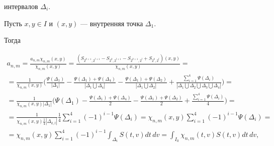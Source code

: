 интервалов $\Delta _{i}$.





Пусть $x,y\in I$ и $(x,y)$ --- внутренняя точка $\Delta _{1}$. 


Тогда 


\begin{gather*}


a_{n,m}=\frac{a_{n,m}\chi _{n,m}(x,y)}{\chi _{n,m}(x,y)}=


\frac{\left(S_{2^{k+1},2^{l+1}}-S_{2^{k},2^{l+1}}


-S_{2^{k+1},2^{l}}+S_{2^{k},2^{l}}\right) (x,y)}{\chi _{n,m}(x,y)}=\\


%


=\displaystyle \frac{1}{\chi _{n,m}(x,y)}\bigg(\frac{\Psi (\Delta _{1})}


{| \Delta _{1}| }-\displaystyle\frac{\Psi (\Delta _{1})+


\Psi (\Delta _{4})}{| \Delta _{1}\bigcup \Delta _{4}| }-


\displaystyle\frac{\Psi (\Delta _{1})+\Psi (\Delta _{2})}


{| \Delta _{1}\bigcup \Delta _{2}| }+ \displaystyle\frac


{\sum\limits_{i=1}^{4}\Psi (\Delta _{i})}


{| \Delta _{1}\bigcup \Delta _{2}\bigcup \Delta _{3}\bigcup \Delta _{4}| }


\bigg) =\\


%


=\displaystyle\frac{1}{\chi _{n,m}(x,y)| \Delta _{1}| }


\bigg(\Psi (\Delta _{1})


-\displaystyle\frac{\Psi (\Delta _{1})+\Psi (\Delta _{4})}{2}-


\displaystyle\frac{\Psi (\Delta _{1})+\Psi (\Delta _{2})}{2}+


\displaystyle\frac{\sum\limits_{i=1}^{4}\Psi (\Delta _{i})}{4}\bigg) =\\


%


=\displaystyle \frac{1}{\chi _{n,m}(x,y)\frac{1}{4}


| \Delta _{k,l}| }\displaystyle\frac{1}{4}\sum\limits_{i=1}^{4}


({-1})^{i-1}\Psi (\Delta _{i})=


\chi _{n,m}(x,y)\sum\limits_{i=1}^{4}({-1})^{i-1}\Psi (\Delta _{i})=\\


%


=\chi _{n,m}(x,y)\sum\limits_{i=1}^{4}({-1})^{i-1}


\int_{\Delta _{i}}S(t,v)dt\,dv=


\int_{I_{0}}\chi _{n,m}(t,v)S(t,v)dt\,dv,


\end{gather*}


